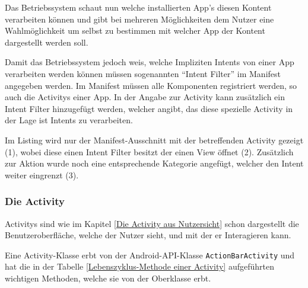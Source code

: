 

Das Betriebssystem schaut nun welche installierten App's diesen Kontent verarbeiten k\"onnen und gibt bei mehreren M\"oglichkeiten dem Nutzer eine Wahlm\"oglichkeit um selbst zu bestimmen mit welcher App der Kontent dargestellt werden soll.

Damit das Betriebssystem jedoch weis, welche Impliziten Intents von einer App verarbeiten werden k\"onnen m\"ussen sogenannten "`Intent Filter"' im Manifest angegeben werden.
Im Manifest m\"ussen alle Komponenten registriert werden, so auch die Activitys einer App. In der Angabe zur Activity kann zus\"atzlich ein Intent Filter hinzugef\"ugt werden, welcher angibt, das diese spezielle Activity in der Lage ist Intents zu verarbeiten.

Im Listing wird nur der Manifest-Ausschnitt mit der betreffenden Activity gezeigt (1), wobei diese einen Intent Filter besitzt der einen View \"offnet (2). Zus\"atzlich zur Aktion wurde noch eine entsprechende Kategorie angef\"ugt, welcher den Intent weiter eingrenzt (3). \cite{VogellaIntent}



\subsubsection{Die Activity} \label{Die Activity aus Programmierersicht}
Activitys sind wie im Kapitel \ref{Die Activity aus Nutzersicht} schon dargestellt die Benutzeroberfl\"ache, welche der Nutzer sieht, und mit der er Interagieren kann.

Eine Activity-Klasse erbt von der Android-API-Klasse \texttt{ActionBarActivity} und hat die in der Tabelle \ref{Lebenszyklus-Methode einer Activity} aufgef\"uhrten wichtigen Methoden, welche sie von der Oberklasse erbt.

